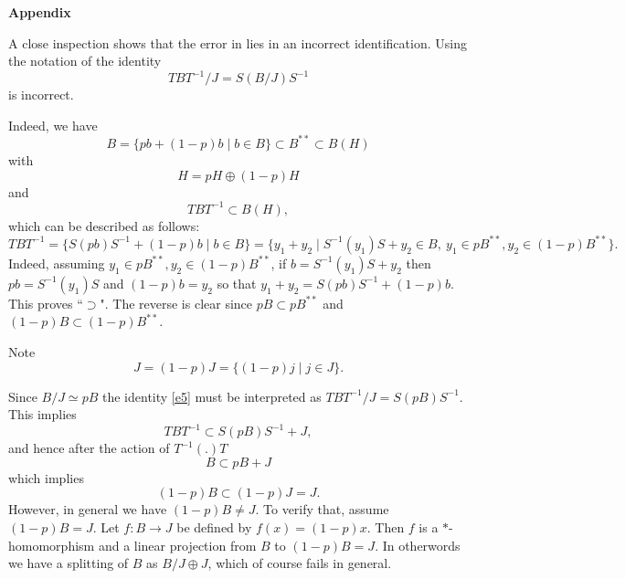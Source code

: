 \documentclass[11pt,leqno]{article}
\theoremstyle{plain}
\theoremstyle{definition}
\theoremstyle{remark}
\numberwithin{equation}{section}
\begin{document}
     \vfill\eject
     
     
    \centerline{\bf Appendix}  
    
    \bigskip
    
    A close inspection  shows that the error  in \cite{[19]} lies in an incorrect identification.
    Using the notation of \cite{[19]}
    the identity
    \begin{equation}  \label{e5}
    TBT^{-1}/J= S(B/J)S^{-1} \end{equation}
    is incorrect.
    
    Indeed,  we have
    $$B=\{pb +(1-p)b \mid b\in B\} \subset B^{**} \subset B(H)$$
    with
    $$H=pH \oplus (1-p) H$$
    and 
    $$TBT^{-1} \subset B(H),$$
    which can be described as follows:
    $$TBT^{-1} =\{ S(pb)S^{-1} + (1-p) b \mid b\in B\}= \{ y_1+y_2 \mid S^{-1}(y_1)S +y_2 \in B 
    , \ y_1\in pB^{**}, y_2\in (1-p)B^{**} \}.$$
    Indeed, 
    assuming
    $y_1\in pB^{**}, y_2\in (1-p)B^{**} $,
    if $b= S^{-1}(y_1)S +y_2$ then $pb=S^{-1}(y_1)S $ and $ (1-p) b= y_2$ so that
  $y_1+y_2 =S(pb)S^{-1} + (1-p) b$. This proves ``$\supset$". The reverse is clear since
  $pB \subset pB^{**}$ and $(1-p) B \subset (1-p) B^{**}$.
  
  Note
  $$J=(1-p)J=\{ (1-p)j \mid j\in J\} .$$
   

 Since $B/J\simeq pB$
  the
identity \eqref{e5} must be interpreted as $ TBT^{-1}/J= S(pB)S^{-1}$. This
implies 
$$ TBT^{-1}\subset S(pB)S^{-1} + J,$$
and hence after the action of $  T^{-1} (.)T$ 
$$B\subset pB + J$$
which implies
$$(1-p) B \subset (1-p) J  =J.$$
However, in general we have $  (1-p) B \not= J$.
To verify that, assume $  (1-p) B  = J$. 
Let $f: B \to J $ be defined by $f(x)=   (1-p) x .$
Then $f$ is a $*$-homomorphism and a linear projection
from $B$ to $(1-p) B  = J$. In otherwords we have a splitting
of $B$ as $B/J\oplus J$, which of course fails in general.
\end{document}
